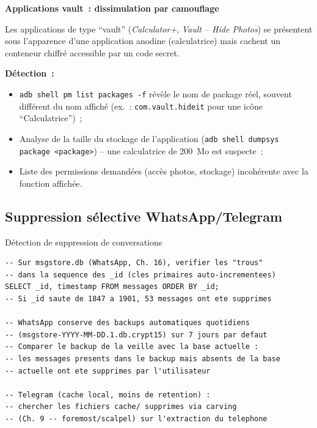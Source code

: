 \begin{boxalert}
\textbf{Applications vault~: dissimulation par camouflage}

Les applications de type ``vault'' (\textit{Calculator+},
\textit{Vault -- Hide Photos}) se présentent sous l'apparence
d'une application anodine (calculatrice) mais cachent un conteneur
chiffré accessible par un code secret.

\textbf{Détection~:}
\begin{itemize}
    \item \texttt{adb shell pm list packages -f} révèle le nom de
          package réel, souvent différent du nom affiché
          (ex.~: \texttt{com.vault.hideit} pour une icône
          ``Calculatrice'')~;
    \item Analyse de la taille du stockage de l'application
          (\texttt{adb shell dumpsys package <package>}) -- une
          calculatrice de 200~Mo est suspecte~;
    \item Liste des permissions demandées (accès photos, stockage)
          incohérente avec la fonction affichée.
\end{itemize}
\end{boxalert}

\subsection{Suppression sélective WhatsApp/Telegram}

\begin{boxoutils}{Détection de suppression de conversations}
\begin{lstlisting}[language=bash_forensique]
-- Sur msgstore.db (WhatsApp, Ch. 16), verifier les "trous"
-- dans la sequence des _id (cles primaires auto-incrementees)
SELECT _id, timestamp FROM messages ORDER BY _id;
-- Si _id saute de 1847 a 1901, 53 messages ont ete supprimes

-- WhatsApp conserve des backups automatiques quotidiens
-- (msgstore-YYYY-MM-DD.1.db.crypt15) sur 7 jours par defaut
-- Comparer le backup de la veille avec la base actuelle :
-- les messages presents dans le backup mais absents de la base
-- actuelle ont ete supprimes par l'utilisateur

-- Telegram (cache local, moins de retention) :
-- chercher les fichiers cache/ supprimes via carving
-- (Ch. 9 -- foremost/scalpel) sur l'extraction du telephone
\end{lstlisting}
\end{boxoutils}

